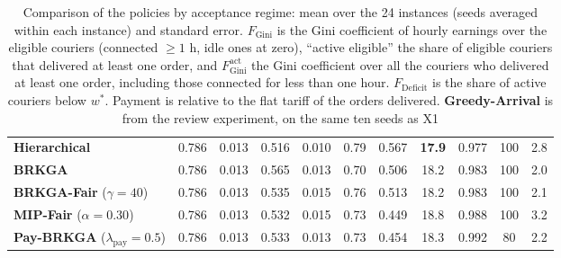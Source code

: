 \documentclass[a4paper,11pt,review,3p,authoryear]{elsarticle}
\newcommand{\FG}{F_{\text{Gini}}}
\newcommand{\FGa}{F_{\text{Gini}}^{\text{act}}}
\newcommand{\FD}{F_{\text{Deficit}}}
\begin{document}
\begin{table}[htbp]
\begin{adjustbox}{max width=\textwidth}
\begin{tabular}{l|cc|cc|c|c|c|c|c|c}
\textbf{Hierarchical} & 0.786 & 0.013 & 0.516 & 0.010 & 0.79 & 0.567 & \textbf{17.9} & 0.977 & 100 & 2.8 \\
\textbf{BRKGA} & 0.786 & 0.013 & 0.565 & 0.013 & 0.70 & 0.506 & 18.2 & 0.983 & 100 & 2.0 \\
\hline
\textbf{BRKGA-Fair} ($\gamma = 40$) & 0.786 & 0.013 & 0.535 & 0.015 & 0.76 & 0.513 & 18.2 & 0.983 & 100 & 2.1 \\
\textbf{MIP-Fair} ($\alpha = 0.30$) & 0.786 & 0.013 & 0.532 & 0.015 & 0.73 & 0.449 & 18.8 & 0.988 & 100 & 3.2 \\
\textbf{Pay-BRKGA} ($\lambda_{\text{pay}} = 0.5$) & 0.786 & 0.013 & 0.533 & 0.013 & 0.73 & 0.454 & 18.3 & 0.992 & 80 & 2.2 \\
\hline
\end{tabular}
\end{adjustbox}
\caption{Comparison of the policies by acceptance regime: mean over the 24 instances (seeds averaged within each instance) and standard error. $\FG$ is the Gini coefficient of hourly earnings over the eligible couriers (connected $\ge 1$ h, idle ones at zero), ``active eligible'' the share of eligible couriers that delivered at least one order, and $\FGa$ the Gini coefficient over all the couriers who delivered at least one order, including those connected for less than one hour. $\FD$ is the share of active couriers below $w^*$. Payment is relative to the flat tariff of the orders delivered. \textbf{Greedy-Arrival} is from the review experiment, on the same ten seeds as X1}
\label{tab:benchmark}
\end{table}
\end{document}
